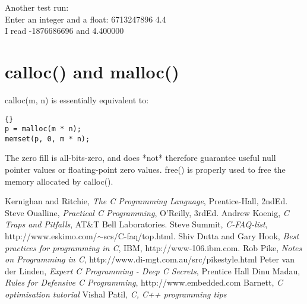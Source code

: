 \documentclass{report}
\begin{document}
Another test run:\\
Enter an integer and a float: 6713247896 4.4\\
I read -1876686696 and 4.400000

\section{calloc() and malloc()}
calloc(m, n) is essentially equivalent to:
\begin{lstlisting}{}
p = malloc(m * n);
memset(p, 0, m * n);
\end{lstlisting}
The zero fill is all-bits-zero, and does *not* therefore guarantee useful null pointer values or floating-point zero values.  free() is properly used to free the memory allocated by calloc().

\begin{thebibliography}{99}
 Kernighan and Ritchie, {\it The C Programming Language}, Prentice-Hall, 2ndEd.
 Steve Oualline, {\it Practical C Programming}, O'Reilly, 3rdEd.
 Andrew Koenig, {\it C Traps and Pitfalls}, AT\&T Bell Laboratories.
 Steve Summit, {\it C-FAQ-list},  http://www.eskimo.com/$\sim$scs/C-faq/top.html.
 Shiv Dutta and Gary Hook, {\it Best practices for programming in C}, IBM, http://www-106.ibm.com.
 Rob Pike, {\it Notes on Programming in C}, http://www.di-mgt.com.au/src/pikestyle.html
 Peter van der Linden, {\it Expert C Programming - Deep C Secrets}, Prentice Hall
 Dinu Madau, {\it Rules for Defensive C Programming}, http://www.embedded.com
 Barnett, {\it C optimisation tutorial}
 Vishal Patil, {\it C, C++ programming tips}
\end{thebibliography}
\end{document}
